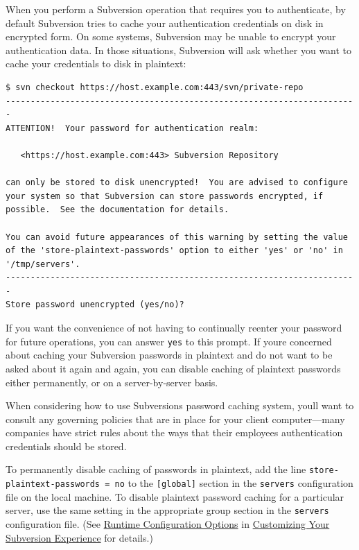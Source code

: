 When you perform a Subversion operation that requires you to
authenticate, by default Subversion tries to cache your authentication
credentials on disk in encrypted form. On some systems, Subversion may
be unable to encrypt your authentication data. In those situations,
Subversion will ask whether you want to cache your credentials to disk
in plaintext:

\begin{verbatim}
$ svn checkout https://host.example.com:443/svn/private-repo
-----------------------------------------------------------------------
ATTENTION!  Your password for authentication realm:

   <https://host.example.com:443> Subversion Repository

can only be stored to disk unencrypted!  You are advised to configure
your system so that Subversion can store passwords encrypted, if
possible.  See the documentation for details.

You can avoid future appearances of this warning by setting the value
of the 'store-plaintext-passwords' option to either 'yes' or 'no' in
'/tmp/servers'.
-----------------------------------------------------------------------
Store password unencrypted (yes/no)? 
\end{verbatim}

If you want the convenience of not having to continually reenter your
password for future operations, you can answer \texttt{yes} to this
prompt. If you\textquotesingle re concerned about caching your
Subversion passwords in plaintext and do not want to be asked about it
again and again, you can disable caching of plaintext passwords either
permanently, or on a server-by-server basis.

When considering how to use Subversion\textquotesingle s password
caching system, you\textquotesingle ll want to consult any governing
policies that are in place for your client computer---many companies
have strict rules about the ways that their employees\textquotesingle{}
authentication credentials should be stored.

To permanently disable caching of passwords in plaintext, add the line
\texttt{store-plaintext-passwords\ =\ no} to the \texttt{{[}global{]}}
section in the \texttt{servers} configuration file on the local machine.
To disable plaintext password caching for a particular server, use the
same setting in the appropriate group section in the \texttt{servers}
configuration file. (See \hyperref[svn.advanced.confarea.opts]{Runtime
Configuration Options} in \hyperref[svn.customization]{Customizing Your
Subversion Experience} for details.)

